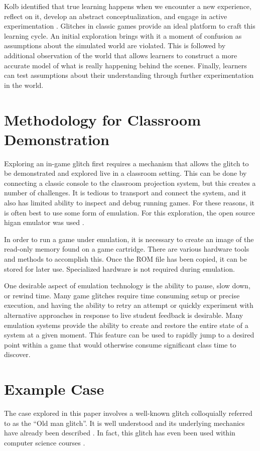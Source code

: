\documentclass[letterpaper]{article}
\begin{document}
Kolb identified that true learning happens when we encounter a new experience, reflect on it, develop an abstract conceptualization, and engage in active experimentation \cite{kolb84}. Glitches in classic games provide an ideal platform to craft this learning cycle. An initial exploration brings with it a moment of confusion as assumptions about the simulated world are violated. This is followed by additional observation of the world that allows learners to construct a more accurate model of what is really happening behind the scenes. Finally, learners can test assumptions about their understanding through further experimentation in the world.

\section{Methodology for Classroom Demonstration}

Exploring an in-game glitch first requires a mechanism that allows the glitch to be demonstrated and explored live in a classroom setting. This can be done by connecting a classic console to the classroom projection system, but this creates a number of challenges. It is tedious to transport and connect the system, and it also has limited ability to inspect and debug running games. For these reasons, it is often best to use some form of emulation. For this exploration, the open source higan emulator was used \cite{ginder2004higan}.

In order to run a game under emulation, it is necessary to create an image of the read-only memory found on a game cartridge. There are various hardware tools and methods to accomplish this. Once the ROM file has been copied, it can be stored for later use. Specialized hardware is not required during emulation.

One desirable aspect of emulation technology is the ability to pause, slow down, or rewind time. Many game glitches require time consuming setup or precise execution, and having the ability to retry an attempt or quickly experiment with alternative approaches in response to live student feedback is desirable. Many emulation systems provide the ability to create and restore the entire state of a system at a given moment. This feature can be used to rapidly jump to a desired point within a game that would otherwise consume significant class time to discover.

\section{Example Case}
The case explored in this paper involves a well-known glitch colloquially referred to as the ``Old man glitch''. It is well understood and its underlying mechanics have already been described \cite{bulbapedia2005} \cite{scrumpy2016missing}. In fact, this glitch has even been used within computer science courses \cite{rjwalls2022}.
\end{document}

